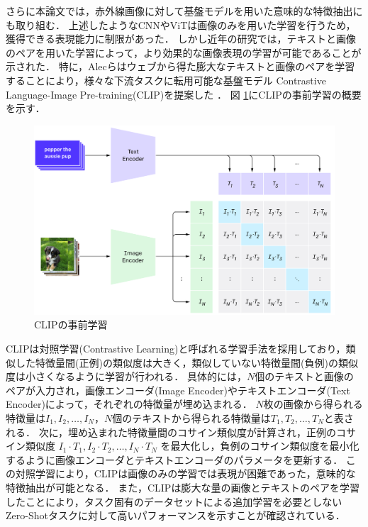 \documentclass[a4paper,11pt,nomag]{jsreport}
\begin{document}
さらに本論文では，赤外線画像に対して基盤モデルを用いた意味的な特徴抽出にも取り組む．
上述したようなCNNやViTは画像のみを用いた学習を行うため，獲得できる表現能力に制限があった．
しかし近年の研究では，テキストと画像のペアを用いた学習によって，より効果的な画像表現の学習が可能であることが示された．
特に，Alecらはウェブから得た膨大なテキストと画像のペアを学習することにより，様々な下流タスクに転用可能な基盤モデル Contrastive Language-Image Pre-training(CLIP)を提案した \cite{clip}．
図 \ref{fig:clip-a}にCLIPの事前学習の概要を示す．
% 
\begin{figure}[tbp]
  \centering
  \includegraphics[width=\linewidth, keepaspectratio]{image/clip-a.png}
  \caption{CLIPの事前学習 \textcolor{red}{\cite{clip}}}
  \label{fig:clip-a}
\end{figure}
% 
CLIPは対照学習(Contrastive Learning)と呼ばれる学習手法を採用しており，類似した特徴量間(正例)の類似度は大きく，類似していない特徴量間(負例)の類似度は小さくなるように学習が行われる．
具体的には，$N$個のテキストと画像のペアが入力され，画像エンコーダ(Image Encoder)やテキストエンコーダ(Text Encoder)によって，それぞれの特徴量が埋め込まれる．
$N$枚の画像から得られる特徴量は$I_1, I_2, \ldots, I_N$，$N$個のテキストから得られる特徴量は$T_1, T_2, \ldots, T_N$と表される．
次に，埋め込まれた特徴量間のコサイン類似度が計算され，正例のコサイン類似度 $I_1 \cdot T_1, I_2 \cdot T_2, \ldots, I_N \cdot T_N$ を最大化し，負例のコサイン類似度を最小化するように画像エンコーダとテキストエンコーダのパラメータを更新する．
この対照学習により，CLIPは画像のみの学習では表現が困難であった，意味的な特徴抽出が可能となる．
また，CLIPは膨大な量の画像とテキストのペアを学習したことにより，タスク固有のデータセットによる追加学習を必要としないZero-Shotタスクに対して高いパフォーマンスを示すことが確認されている．
\end{document}
